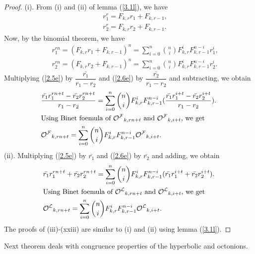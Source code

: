 \begin{proof}
(i). From (i) and (ii) of lemma (\ref{3.1l}), we have
\begin{align*}
&\quad r_1^{r}=F_{k,r}r_1+F_{k,r-1},\\
&\quad r_2^{r}=F_{k,r}r_2+F_{k,r-1}.
\end{align*}
Now, by the binomial theorem, we have
\begin{align}\label{2.5e}
&\quad r_1^{rn}=(F_{k,r}r_1+F_{k,r-1})^n=\sum\limits_{i=0}^{n}\binom{n}{i} F_{k,r}^iF_{k,r-1}^{n-i}r_1^i, \\
&\quad r_2^{rn}=(F_{k,r}r_2+F_{k,r-1})^n=\sum\limits_{i=0}^{n}\binom{n}{i} F_{k,r}^iF_{k,r-1}^{n-i}r_2^i.\label{2.6e}
\end{align}
Multiplying (\ref{2.5e}) by $\dfrac{\bar{r_1}}{r_1-r_2}$ and (\ref{2.6e}) by $\dfrac{\bar{r_2}}{r_1-r_2}$ and subtracting, we obtain \\
\begin{align*}
& \dfrac{\bar{r_{1}}r_1^{rn+t}-\bar{r_{2}}r_2^{rn+t}}{r_1-r_2}=\sum\limits_{i=0}^{n}\binom{n}{i} F_{k,r}^iF_{k,r-1}^{n-i}(\dfrac{\bar{r_{1}}r_1^{i+t}-\bar{r_{2}}r_2^{i+t}}{r_1-r_2}).\\
&\text{Using Binet foemula of ${{\mathcal{O^F}}}_{k,rn+t}$ and ${{\mathcal{O^F}}}_{k,i+t}$, we get}\\
&{{\mathcal{O^F}}}_{k,rn+t}=\sum\limits_{i=0}^{n}\binom{n}{i} F_{k,r}^iF_{k,r-1}^{n-i}{{\mathcal{O^F}}}_{k,i+t}.
\end{align*}
(ii). Multiplying (\ref{2.5e}) by ${\bar{r_1}}$ and (\ref{2.6e}) by ${\bar{r_2}}$ and adding, we obtain \\
\begin{align*}
&\bar{r_{1}}r_1^{rn+t}+\bar{r_{2}}r_2^{rn+t}=\sum\limits_{i=0}^{n}\binom{n}{i} F_{k,r}^iF_{k,r-1}^{n-i}(\bar{r_{1}}r_1^{i+t}+\bar{r_{2}}r_2^{i+t}).\\
&\text{Using Binet foemula of ${{\mathcal{O^L}}}_{k,rn+t}$ and ${{\mathcal{O^L}}}_{k,i+t}$, we get}\\
&{{\mathcal{O^L}}}_{k,rn+t}=\sum\limits_{i=0}^{n}\binom{n}{i} F_{k,r}^iF_{k,r-1}^{n-i}{{\mathcal{O^L}}}_{k,i+t}.
\end{align*}
The proofs of (iii)-(xxiii) are similar to (i) and (ii) using  lemma (\ref{3.1l}).
\end{proof}
\noindent Next theorem deals with congruence properties of the hyperbolic \kF\vspace{.5mm} and \kL\vspace{.5mm} octonions. 
